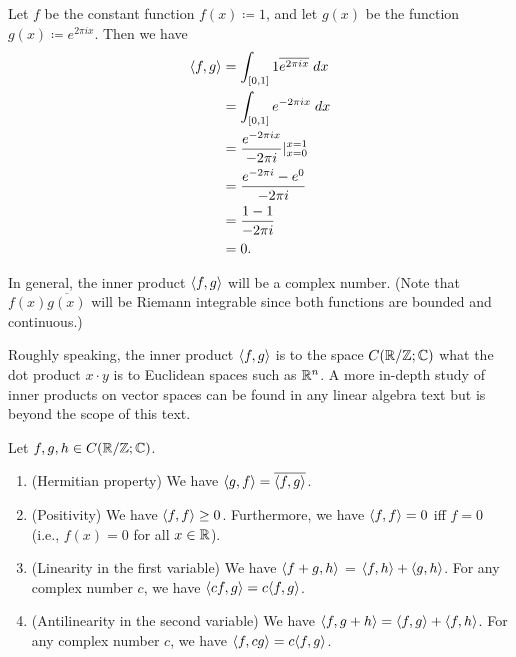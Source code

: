 \begin{eg}\label{ii:5.2.3}
  Let \(f\) be the constant function \(f(x) \coloneqq 1\), and let \(g(x)\) be the function \(g(x) \coloneqq e^{2 \pi i x}\).
  Then we have
  \begin{align*}
    \inner*{f, g} & = \int_{[0, 1]} 1 \overline{e^{2 \pi i x}} \; dx       \\
                  & = \int_{[0, 1]} e^{- 2 \pi i x} \; dx                  \\
                  & = \dfrac{e^{- 2 \pi i x}}{- 2 \pi i} |_{x = 0}^{x = 1} \\
                  & = \dfrac{e^{- 2 \pi i } - e^0}{- 2 \pi i}              \\
                  & = \dfrac{1 - 1}{- 2 \pi i}                             \\
                  & = 0.
  \end{align*}
\end{eg}

\begin{rmk}\label{ii:5.2.4}
  In general, the inner product \(\inner*{f, g}\) will be a complex number.
  (Note that \(f(x) \overline{g(x)}\) will be Riemann integrable since both functions are bounded and continuous.)
\end{rmk}

\begin{note}
  Roughly speaking, the inner product \(\inner*{f, g}\) is to the space \(C(\R / \Z ; \C)\) what the dot product \(x \cdot y\) is to Euclidean spaces such as \(\R^n\).
  A more in-depth study of inner products on vector spaces can be found in any linear algebra text but is beyond the scope of this text.
\end{note}

\begin{lem}\label{ii:5.2.5}
  Let \(f, g, h \in C(\R / \Z ; \C)\).
  \begin{enumerate}
    \item (Hermitian property)
          We have \(\inner*{g, f} = \overline{\inner*{f, g}}\).
    \item (Positivity)
          We have \(\inner*{f, f} \geq 0\).
          Furthermore, we have \(\inner*{f, f} = 0\) iff \(f = 0\)
          (i.e., \(f(x) = 0\) for all \(x \in \R\)).
    \item (Linearity in the first variable)
          We have \(\inner*{f +g, h}\) = \(\inner*{f, h} + \inner*{g, h}\).
          For any complex number \(c\), we have \(\inner*{cf, g} = c \inner*{f, g}\).
    \item (Antilinearity in the second variable)
          We have \(\inner*{f, g + h} = \inner*{f, g} + \inner*{f, h}\).
          For any complex number \(c\), we have \(\inner*{f, cg} = c \inner*{f, g}\).
  \end{enumerate}
\end{lem}

